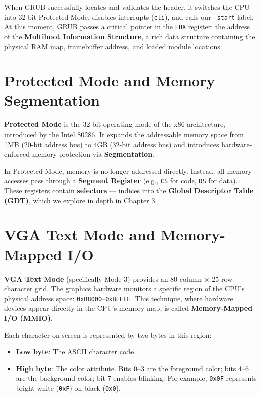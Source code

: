 \documentclass[12pt,a4paper]{report}
\begin{document}
When GRUB successfully locates and validates the header, it switches the CPU into
32-bit Protected Mode, disables interrupts (\texttt{cli}), and calls our \texttt{\_start}
label. At this moment, GRUB passes a critical pointer in the \texttt{EBX} register:
the address of the \textbf{Multiboot Information Structure}, a rich data structure
containing the physical RAM map, framebuffer address, and loaded module locations.

\section{Protected Mode and Memory Segmentation}

\textbf{Protected Mode} is the 32-bit operating mode of the x86 architecture,
introduced by the Intel 80286. It expands the addressable memory space from 1MB
(20-bit address bus) to 4GB (32-bit address bus) and introduces hardware-enforced
memory protection via \textbf{Segmentation}.

In Protected Mode, memory is no longer addressed directly. Instead, all memory
accesses pass through a \textbf{Segment Register} (e.g., \texttt{CS} for code,
\texttt{DS} for data). These registers contain \textbf{selectors} --- indices into the
\textbf{Global Descriptor Table (GDT)}, which we explore in depth in Chapter 3.

\section{VGA Text Mode and Memory-Mapped I/O}

\textbf{VGA Text Mode} (specifically Mode 3) provides an 80-column $\times$ 25-row
character grid. The graphics hardware monitors a specific region of the CPU's physical
address space: \texttt{0xB8000}--\texttt{0xBFFFF}. This technique, where hardware
devices appear directly in the CPU's memory map, is called \textbf{Memory-Mapped I/O (MMIO)}.

Each character on screen is represented by two bytes in this region:
\begin{itemize}
    \item \textbf{Low byte}: The ASCII character code.
    \item \textbf{High byte}: The color attribute. Bits 0--3 are the foreground color;
    bits 4--6 are the background color; bit 7 enables blinking. For example,
    \texttt{0x0F} represents bright white (\texttt{0xF}) on black (\texttt{0x0}).
\end{itemize}
\end{document}
